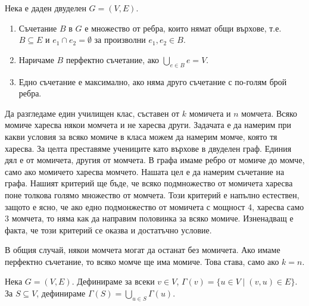\begin{dfn}
  Нека е даден двуделен $G = (V,E)$.
  \begin{enumerate}
  \item
    Съчетание $B$ в $G$ е множество от ребра, които нямат общи върхове, т.е. $B\subseteq E$ и $e_1\cap e_2=\emptyset$
    за произволни $e_1,e_2 \in B$.
  \item
    Наричаме $B$ перфектно съчетание, ако $\bigcup_{e\in B}e = V$.
  \item
    Едно съчетание е максимално, ако няма друго съчетание с по-голям брой ребра.
\end{enumerate}
\end{dfn}


Да разгледаме един училищен клас, съставен от $k$ момичета и $n$ момчета.
Всяко момиче харесва някои момчета и не харесва други.
Задачата е да намерим при какви условия за всяко момиче в класа можем да намерим момче, която тя харесва.
За целта преставяме учениците като върхове в двуделен граф.
Единия дял е от момичета, другия от момчета.
В графа имаме ребро от момиче до момче, само ако момичето харесва момчето.
Нашата цел е да намерим съчетание на графа.
Нашият критерий ще бъде, че всяко подмножество от момичета харесва поне толкова голямо множество от момчета.
Този критерий е напълно естествен, защото е ясно, че ако едно подмонжество от момичета с
мощност 4, харесва само 3 момчета, то няма как да направим половинка за всяко момиче.
Изненадващ е факта, че този критерий се оказва и достатъчно условие.

В общия случай, някои момчета могат да останат без момичета.
Ако имаме перфектно съчетание, то всяко момче ще има момиче.
Това става, само ако $k = n$.

\begin{dfn}
  Нека $G=(V,E)$.
  Дефинираме за всеки $v\in V$, $\Gamma(v) = \{u\in V\mid (v,u) \in E\}$.
  За $S\subseteq V$, дефинираме $\Gamma(S) = \bigcup_{u\in S}\Gamma(u)$.
\end{dfn}

